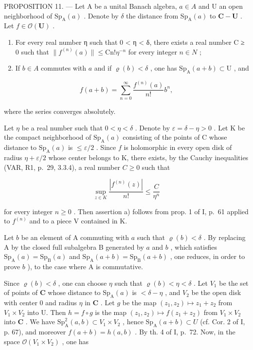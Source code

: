 PROPOSITION 11. --- Let A be a unital Banach algebra, \(a \in A\) and U an open neighborhood of \(\mathrm{Sp}_{\mathrm{A}}(a)\) . Denote by \(\delta\) the distance from \(\mathrm{Sp}_{\mathrm{A}}(a)\) to \(\mathbf{C} - \mathbf{U}\) . Let \(f \in \mathcal{O}(\mathbf{U})\) .

\begin{enumerate}
\def\labelenumi{\alph{enumi})}
\item
  For every real number η such that 0 \textless{} η \textless{} δ, there exists a real number C ≥ 0 such that \(\|f^{(n)}(a)\| \leqslant \mathrm{Cn}!\eta^{-n}\) for every integer \(n \in N\) ;
\item
  If \(b \in A\) commutes with \(a\) and if \(\varrho(b) < \delta\) , one has \(\mathrm{Sp}_{\mathrm{A}}(a + b) \subset \mathrm{U}\) , and
\end{enumerate}

\[
f (a + b) = \sum_ {n = 0} ^ {\infty} \frac {f ^ {(n)} (a)}{n !} b ^ {n},
\]

where the series converges absolutely.

Let \(\eta\) be a real number such that \(0 < \eta < \delta\) . Denote by \(\varepsilon = \delta - \eta > 0\) . Let K be the compact neighborhood of \(\mathrm{Sp}_{\mathrm{A}}(a)\) consisting of the points of C whose distance to \(\mathrm{Sp}_{\mathrm{A}}(a)\) is \(\leqslant \varepsilon / 2\) . Since \(f\) is holomorphic in every open disk of radius \(\eta + \varepsilon / 2\) whose center belongs to K, there exists, by the Cauchy inequalities (VAR, R1, p.~29, 3.3.4), a real number \(C \geqslant 0\) such that

\[
\sup _ {z \in K} \frac {| f ^ {(n)} (z) |}{n !} \leqslant \frac {C}{\eta^ {n}}
\]

for every integer \(n \geqslant 0\) . Then assertion a) follows from prop. 1 of I, p.~61 applied to \(f^{(n)}\) and to a piece V contained in K.

Let \(b\) be an element of A commuting with \(a\) such that \(\varrho(b) < \delta\) . By replacing A by the closed full subalgebra B generated by \(a\) and \(b\) , which satisfies \(\mathrm{Sp}_{\mathrm{A}}(a) = \mathrm{Sp}_{\mathrm{B}}(a)\) and \(\mathrm{Sp}_{\mathrm{A}}(a + b) = \mathrm{Sp}_{\mathrm{B}}(a + b)\) , one reduces, in order to prove \(b\) ), to the case where A is commutative.

Since \(\varrho(b) < \delta\) , one can choose \(\eta\) such that \(\varrho(b) < \eta < \delta\) . Let \(V_1\) be the set of points of \(\mathbf{C}\) whose distance to \(\mathrm{Sp}_{\mathrm{A}}(a)\) is \(< \delta - \eta\) , and \(V_2\) be the open disk with center 0 and radius \(\eta\) in \(\mathbf{C}\) . Let \(g\) be the map \((z_1, z_2) \mapsto z_1 + z_2\) from \(V_1 \times V_2\) into U. Then \(h = f \circ g\) is the map \((z_1, z_2) \mapsto f(z_1 + z_2)\) from \(V_1 \times V_2\) into \(\mathbf{C}\) . We have \(\mathrm{Sp}_{\mathrm{A}}^{2}(a, b) \subset V_1 \times V_2\) , hence \(\mathrm{Sp}_{\mathrm{A}}(a + b) \subset U\) (cf. Cor. 2 of I, p. 67), and moreover \(f(a + b) = h(a, b)\) . By th. 4 of I, p.~72. Now, in the space \(\mathcal{O}(V_1 \times V_2)\) , one has

